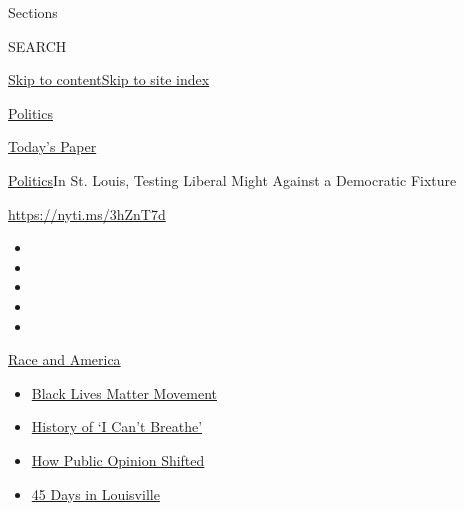 Sections

SEARCH

\protect\hyperlink{site-content}{Skip to
content}\protect\hyperlink{site-index}{Skip to site index}

\href{https://www.nytimes3xbfgragh.onion/section/politics}{Politics}

\href{https://myaccount.nytimes3xbfgragh.onion/auth/login?response_type=cookie\&client_id=vi}{}

\href{https://www.nytimes3xbfgragh.onion/section/todayspaper}{Today's
Paper}

\href{/section/politics}{Politics}\textbar{}In St. Louis, Testing
Liberal Might Against a Democratic Fixture

\url{https://nyti.ms/3hZnT7d}

\begin{itemize}
\item
\item
\item
\item
\item
\end{itemize}

\href{https://www.nytimes3xbfgragh.onion/news-event/george-floyd-protests-minneapolis-new-york-los-angeles?action=click\&pgtype=Article\&state=default\&region=TOP_BANNER\&context=storylines_menu}{Race
and America}

\begin{itemize}
\tightlist
\item
  \href{https://www.nytimes3xbfgragh.onion/interactive/2020/07/03/us/george-floyd-protests-crowd-size.html?action=click\&pgtype=Article\&state=default\&region=TOP_BANNER\&context=storylines_menu}{Black
  Lives Matter Movement}
\item
  \href{https://www.nytimes3xbfgragh.onion/interactive/2020/06/28/us/i-cant-breathe-police-arrest.html?action=click\&pgtype=Article\&state=default\&region=TOP_BANNER\&context=storylines_menu}{History
  of `I Can't Breathe'}
\item
  \href{https://www.nytimes3xbfgragh.onion/interactive/2020/06/10/upshot/black-lives-matter-attitudes.html?action=click\&pgtype=Article\&state=default\&region=TOP_BANNER\&context=storylines_menu}{How
  Public Opinion Shifted}
\item
  \href{https://www.nytimes3xbfgragh.onion/interactive/2020/07/16/us/black-lives-matter-protests-louisville-breonna-taylor.html?action=click\&pgtype=Article\&state=default\&region=TOP_BANNER\&context=storylines_menu}{45
  Days in Louisville}
\end{itemize}

